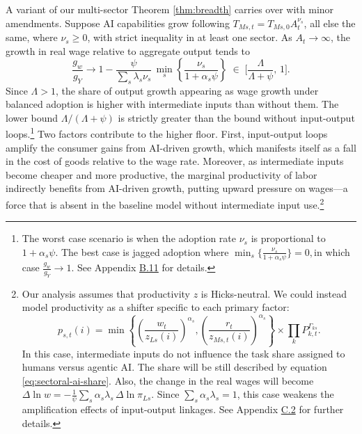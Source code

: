 \documentclass[11pt]{article}
\begin{document}
A variant of our multi-sector Theorem \ref{thm:breadth} carries over
with minor amendments. Suppose AI capabilities grow following $T_{Ms,t}=T_{Ms,0}A^{\nu_{s}}_{t}$,
all else the same, where $\nu_{s}\geq0$, with strict inequality in
at least one sector. As $A_{t}\to\infty$, the growth in real wage
relative to aggregate output tends to
\begin{equation}
\frac{g_{w}}{g_{Y}}\longrightarrow1-\frac{\psi}{\sum_{s}\lambda_{s}\nu_{s}}\,\min_{s}\left\{ \frac{\nu_{s}}{1+\alpha_{s}\psi}\right\} \;\in\;\Big[\frac{\Lambda}{\Lambda+\psi},\,1\Big].\label{eq:io-incidence}
\end{equation}
Since $\Lambda>1$, the share of output growth appearing as wage growth
under balanced adoption is higher with intermediate inputs than without
them. The lower bound $\Lambda/(\Lambda+\psi)$ is strictly greater
than the bound without input-output loops.\footnote{The worst case scenario is when the adoption rate $\nu_{s}$ is proportional
to $1+\alpha_{s}\psi$. The best case is jagged adoption where $\ensuremath{\min_{s}\{\frac{\nu_{s}}{1+\alpha_{s}\psi}\}=0},$in
which case $\frac{g_{w}}{g_{Y}}\longrightarrow1$. See Appendix \href{https://ahmadlp.github.io/Lashkaripour_AI_Displacement_Online_Appendix.pdf\#page=61}{B.11}
for details.} Two factors contribute to the higher floor. First, input-output loops
amplify the consumer gains from AI-driven growth, which manifests
itself as a fall in the cost of goods relative to the wage rate. Moreover,
as intermediate inputs become cheaper and more productive, the marginal
productivity of labor indirectly benefits from AI-driven growth, putting
upward pressure on wages---a force that is absent in the baseline model
without intermediate input use.\footnote{Our analysis assumes that productivity $z$ is Hicks-neutral. We could
instead model productivity as a shifter specific to each primary factor:
\[p_{s,t}(i)=\min\left\{ (\frac{w_{t}}{z_{Ls}(i)})^{\alpha_{s}},(\frac{r_{t}}{z_{Ms,t}(i)})^{\alpha_{s}}\right\} \times\prod_{k}P^{\Gamma_{ks}}_{k,t}.\]
In this case, intermediate inputs do not influence the task share
assigned to humans versus agentic AI. The share will be still described
by equation \eqref{eq:sectoral-ai-share}. Also, the change in the
real wages will become $\Delta\ln w=-\frac{1}{\psi}\sum_{s}\alpha_{s}\lambda_{s}\,\Delta\ln\pi_{Ls}$.
Since $\sum_{s}\alpha_{s}\lambda_{s}=1$, this case weakens the amplification
effects of input-output linkages. See Appendix \href{https://ahmadlp.github.io/Lashkaripour_AI_Displacement_Online_Appendix.pdf\#page=75}{C.2}
for further details.}
\end{document}
